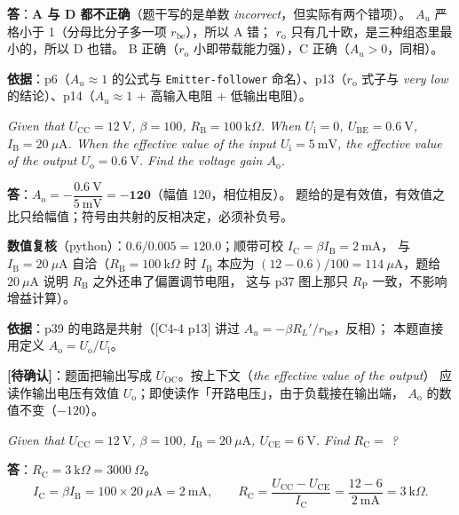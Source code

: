 \documentclass[11pt]{ctexart}
\begin{document}
\textbf{答}：\textbf{A 与 D 都不正确}（题干写的是单数 \textit{incorrect}，但实际有两个错项）。
$A_u$ 严格小于 1（分母比分子多一项 $r_{\mathrm{be}}$），所以 A 错；
$r_{\mathrm{o}}$ 只有几十欧，是三种组态里最小的，所以 D 也错。
B 正确（$r_{\mathrm{o}}$ 小即带载能力强），C 正确（$A_u>0$，同相）。

\textbf{依据}：p6（$A_u\approx1$ 的公式与 \texttt{Emitter-follower} 命名）、p13（$r_{\mathrm{o}}$ 式子与
\textit{very low} 的结论）、p14（$A_u\approx1$ + 高输入电阻 + 低输出电阻）。


\textit{Given that $U_{\mathrm{CC}}=12\ \mathrm{V}$, $\beta=100$, $R_{\mathrm{B}}=100\ \mathrm{k}\Omega$. When $U_{\mathrm{i}}=0$,
$U_{\mathrm{BE}}=0.6\ \mathrm{V}$, $I_{\mathrm{B}}=20\ \mu\mathrm{A}$. When the effective value of the input $U_{\mathrm{i}}=5\ \mathrm{mV}$,
the effective value of the output $U_{\mathrm{o}}=0.6\ \mathrm{V}$. Find the voltage gain $A_{\mathrm{o}}$.}

\textbf{答}：$A_{\mathrm{o}}=-\dfrac{0.6\ \mathrm{V}}{5\ \mathrm{mV}}=\mathbf{-120}$（幅值 120，相位相反）。
题给的是有效值，有效值之比只给幅值；符号由共射的反相决定，必须补负号。

\textbf{数值复核}（python）：$0.6/0.005=120.0$；顺带可校 $I_{\mathrm{C}}=\beta I_{\mathrm{B}}=2\ \mathrm{mA}$，
与 $I_{\mathrm{B}}=20\ \mu\mathrm{A}$ 自洽（$R_{\mathrm{B}}=100\ \mathrm{k}\Omega$ 时 $I_{\mathrm{B}}$ 本应为
$(12-0.6)/100=114\ \mu\mathrm{A}$，题给 $20\ \mu\mathrm{A}$ 说明 $R_{\mathrm{B}}$ 之外还串了偏置调节电阻，
这与 p37 图上那只 $R_{\mathrm{P}}$ 一致，不影响增益计算）。

\textbf{依据}：p39 的电路是共射（[C4-4 p13] 讲过 $A_u=-\beta R_L'/r_{\mathrm{be}}$，反相）；
本题直接用定义 $A_{\mathrm{o}}=U_{\mathrm{o}}/U_{\mathrm{i}}$。

\textbf{[待确认]}：题面把输出写成 $U_{\mathrm{OC}}$。按上下文（\textit{the effective value of the output}）
应读作输出电压有效值 $U_{\mathrm{o}}$；即使读作「开路电压」，由于负载接在输出端，
$A_{\mathrm{o}}$ 的数值不变（$-120$）。


\textit{Given that $U_{\mathrm{CC}}=12\ \mathrm{V}$, $\beta=100$, $I_{\mathrm{B}}=20\ \mu\mathrm{A}$, $U_{\mathrm{CE}}=6\ \mathrm{V}$. Find $R_{\mathrm{C}}=$ ?}

\textbf{答}：$R_{\mathrm{C}}=3\ \mathrm{k}\Omega=3000\ \Omega$。
\[
I_{\mathrm{C}}=\beta I_{\mathrm{B}}=100\times20\ \mu\mathrm{A}=2\ \mathrm{mA},\qquad
R_{\mathrm{C}}=\frac{U_{\mathrm{CC}}-U_{\mathrm{CE}}}{I_{\mathrm{C}}}=\frac{12-6}{2\ \mathrm{mA}}=3\ \mathrm{k}\Omega .
\]
\end{document}
